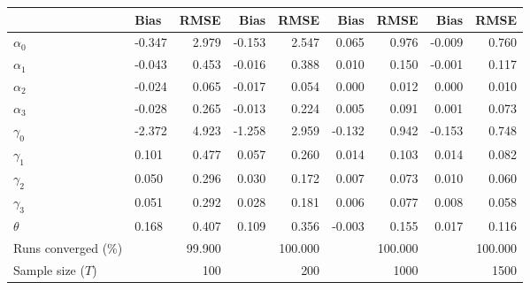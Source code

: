 
\begin{tabular}[t]{llrrrrrrr}
\toprule
  & Bias & RMSE & Bias & RMSE & Bias & RMSE & Bias & RMSE\\
\midrule
$\alpha_{0}$ & -0.347 & 2.979 & -0.153 & 2.547 & 0.065 & 0.976 & -0.009 & 0.760\\
$\alpha_{1}$ & -0.043 & 0.453 & -0.016 & 0.388 & 0.010 & 0.150 & -0.001 & 0.117\\
$\alpha_{2}$ & -0.024 & 0.065 & -0.017 & 0.054 & 0.000 & 0.012 & 0.000 & 0.010\\
$\alpha_{3}$ & -0.028 & 0.265 & -0.013 & 0.224 & 0.005 & 0.091 & 0.001 & 0.073\\
$\gamma_{0}$ & -2.372 & 4.923 & -1.258 & 2.959 & -0.132 & 0.942 & -0.153 & 0.748\\
$\gamma_{1}$ & 0.101 & 0.477 & 0.057 & 0.260 & 0.014 & 0.103 & 0.014 & 0.082\\
$\gamma_{2}$ & 0.050 & 0.296 & 0.030 & 0.172 & 0.007 & 0.073 & 0.010 & 0.060\\
$\gamma_{3}$ & 0.051 & 0.292 & 0.028 & 0.181 & 0.006 & 0.077 & 0.008 & 0.058\\
$\theta$ & 0.168 & 0.407 & 0.109 & 0.356 & -0.003 & 0.155 & 0.017 & 0.116\\
Runs converged (\%) &  & 99.900 &  & 100.000 &  & 100.000 &  & 100.000\\
Sample size ($T$) &  & 100 &  & 200 &  & 1000 &  & 1500\\
\bottomrule
\end{tabular}
